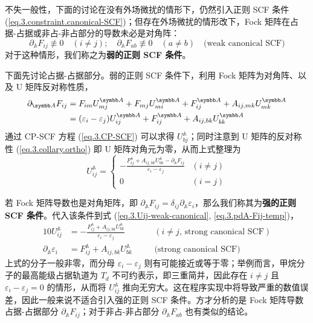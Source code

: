 不失一般性，下面的讨论在没有外场微扰的情形下，仍然引入正则 SCF 条件 (\ref{eq.3.constraint.canonical-SCF})；但存在外场微扰的情形改下，Fock 矩阵在占据-占据或非占-非占部分的导数未必是对角阵：
\begin{equation}
    \label{eq.3.weak-canonical-SCF}
    \partial_\mathbb{A} F_{ij} \not \equiv 0 \quad (i \neq j); \quad \partial_\mathbb{A} F_{ab} \not \equiv 0 \quad (a \neq b) \quad \text{(weak canonical SCF)}
\end{equation}
对于这种情形，我们称之为\textbf{弱的正则 SCF 条件}。

下面先讨论占据-占据部分。弱的正则 SCF 条件下，利用 Fock 矩阵为对角阵、以及 U 矩阵反对称性质，
\begin{align}
    \label{eq.3.pdA-Fij-temp}
    \partial_\mathbb{A} F_{ij} &= F_{im} U_{mj}^\mathbb{A} + F_{mj} U_{mi}^\mathbb{A} + F_{ij}^\mathbb{A} + A_{ij, mk} U_{mk}^\mathbb{A} \notag\\
    &= (\varepsilon_i - \varepsilon_j) U_{ij}^\mathbb{A} + F_{ij}^\mathbb{A} + A_{ij, bk} U_{bk}^\mathbb{A}
\end{align}
通过 CP-SCF 方程 (\ref{eq.3.CP-SCF}) 可以求得 $U_{bj}^\mathbb{A}$；同时注意到 U 矩阵的反对称性 (\ref{eq.3.collary.ortho}) 即 U 矩阵对角元为零，从而上式整理为
\begin{equation}
    \label{eq.3.Uij-weak-canonical}
    U_{ij}^\mathbb{A} = 
    \begin{cases}
    \displaystyle
    - \frac{F_{ij}^\mathbb{A} + A_{ij, bk} U_{bk}^\mathbb{A} - \partial_\mathbb{A} F_{ij}}{\varepsilon_i - \varepsilon_j} & (i \neq j) \\
    0 & (i = j)
    \end{cases}
\end{equation}

若 Fock 矩阵导数也是对角矩阵，即 $\partial_\mathbb{A} F_{ij} = \delta_{ij} \partial_\mathbb{A} \varepsilon_i$，那么我们称其为\textbf{强的正则 SCF 条件}。代入该条件到式 (\ref{eq.3.Uij-weak-canonical}, \ref{eq.3.pdA-Fij-temp})，
\begin{alignat}{10}
    \label{eq.3.unstable-Uij}
    U_{ij}^\mathbb{A} &= - \frac{F_{ij}^\mathbb{A} + A_{ij, bk} U_{bk}^\mathbb{A}}{\varepsilon_i - \varepsilon_j} &&\quad \left( i \neq j, \, \text{strong canonical SCF}\right) \\
    \label{eq.3.unstable-pdA-eo}
    \partial_\mathbb{A} \varepsilon_i &= F_{ij}^\mathbb{A} + A_{ij, bk} U_{bk}^\mathbb{A} &&\quad \text{(strong canonical SCF)}
\end{alignat}
上式的分子一般非零，而分母 $\varepsilon_i - \varepsilon_j$ 则有可能接近或等于零；举例而言，甲烷分子的最高能级占据轨道为 $T_d$ 不可约表示，即三重简并，因此存在 $i \neq j$ 且 $\varepsilon_i - \varepsilon_j = 0$ 的情形，从而将 $U_{ij}^\mathbb{A}$ 推向无穷大。这在程序实现中将导致严重的数值误差，因此一般来说不适合引入强的正则 SCF 条件。方才分析的是 Fock 矩阵导数占据-占据部分 $\partial_\mathbb{A} F_{ij}$；对于非占-非占部分 $\partial_\mathbb{A} F_{ab}$ 也有类似的结论。

